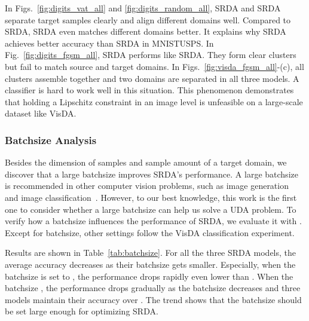 \documentclass[journal,twocolumn]{IEEEtran}
\theoremstyle{definition}
\begin{document}
In Figs.~\ref{fig:digits_vat_all} and \ref{fig:digits_random_all}, SRDA and SRDA separate target samples clearly and align different domains well. Compared to SRDA, SRDA even matches different domains better. It explains why SRDA achieves better accuracy than SRDA in MNISTUSPS. In Fig.~\ref{fig:digits_fgsm_all}, SRDA performs like SRDA. They form clear clusters but fail to match source and target domains. In Figs.~\ref{fig:visda_fgsm_all}-(c), all clusters assemble together and two domains are separated in all three models. A classifier is hard to work well in this situation. This phenomenon demonstrates that holding a Lipschitz constraint in an image level is unfeasible on a large-scale dataset like VisDA.

\subsubsection{Batchsize Analysis}
\label{batchsize_exp}

Besides the dimension of samples and sample amount of a target domain,  we discover that a large batchsize improves SRDA's performance. A large batchsize is recommended in other computer vision problems, such as image generation~\cite{brock2018large} and image classification~\cite{He_2019_CVPR}. However, to our best knowledge, this work is the first one to consider whether a large batchsize can help us solve a UDA problem. To verify how a batchsize influences the performance of SRDA, we evaluate it with . Except for batchsize, other settings follow the VisDA classification experiment.

Results are shown in Table~\ref{tab:batchsize}. For all the three SRDA models, the average accuracy decreases as their batchsize gets smaller. Especially, when the batchsize is set to , the performance drops rapidly even lower than . When the batchsize , the performance drops gradually  as the batchsize decreases and three models maintain their accuracy over . The trend shows that the batchsize should be set large enough for optimizing SRDA.
\begin{table}[htbp]
\centering
\caption{Classification accuracy percentage of VisDA classification experiment for different batchsize.}
\label{tab:batchsize}
\end{table}
\end{document}
